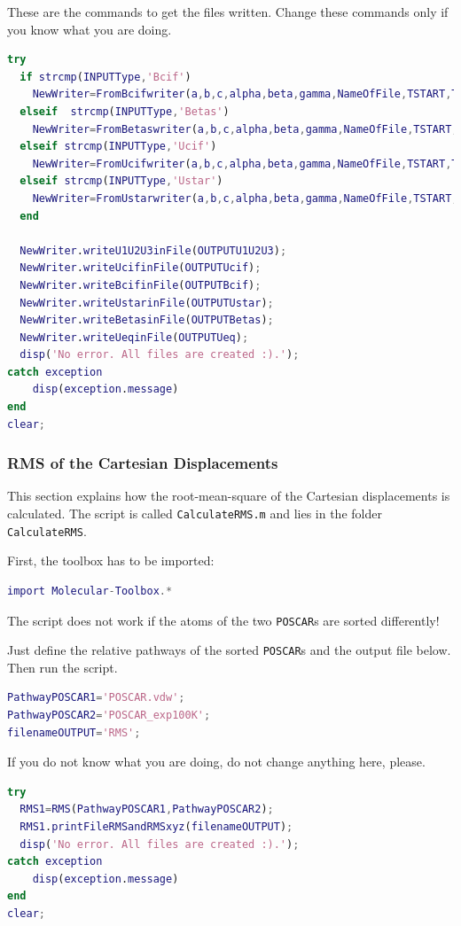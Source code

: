 \documentclass[12pt,a4paper]{article}
\begin{document}
These are the commands to get the files written. Change these commands only if you know what you are doing.
\begin{lstlisting}[frame=single,language=Matlab] 
try
  if strcmp(INPUTType,'Bcif')
    NewWriter=FromBcifwriter(a,b,c,alpha,beta,gamma,NameOfFile,TSTART,TEND,TSTEP,NumberofAtomsPerTemperature);
  elseif  strcmp(INPUTType,'Betas')
    NewWriter=FromBetaswriter(a,b,c,alpha,beta,gamma,NameOfFile,TSTART,TEND,TSTEP,NumberofAtomsPerTemperature);
  elseif strcmp(INPUTType,'Ucif')
    NewWriter=FromUcifwriter(a,b,c,alpha,beta,gamma,NameOfFile,TSTART,TEND,TSTEP,NumberofAtomsPerTemperature);
  elseif strcmp(INPUTType,'Ustar')
    NewWriter=FromUstarwriter(a,b,c,alpha,beta,gamma,NameOfFile,TSTART,TEND,TSTEP,NumberofAtomsPerTemperature);
  end

  NewWriter.writeU1U2U3inFile(OUTPUTU1U2U3);
  NewWriter.writeUcifinFile(OUTPUTUcif);
  NewWriter.writeBcifinFile(OUTPUTBcif);
  NewWriter.writeUstarinFile(OUTPUTUstar);
  NewWriter.writeBetasinFile(OUTPUTBetas);
  NewWriter.writeUeqinFile(OUTPUTUeq);
  disp('No error. All files are created :).');
catch exception
    disp(exception.message)
end
clear;
\end{lstlisting}



    


\subsubsection{RMS of the Cartesian Displacements}
This section explains how the root-mean-square of the Cartesian displacements is calculated. The script is called \texttt{CalculateRMS.m} and lies in the folder \texttt{CalculateRMS}.

First, the toolbox has to be imported:

\begin{lstlisting}[frame=single,language=Matlab] 
import Molecular-Toolbox.*
\end{lstlisting}
The script does not work if the atoms of the two \texttt{POSCAR}s are sorted differently!

Just define the relative pathways of the sorted \texttt{POSCAR}s and the output file below. Then run the script.
\begin{lstlisting}[frame=single,language=Matlab] 
PathwayPOSCAR1='POSCAR.vdw';
PathwayPOSCAR2='POSCAR_exp100K';
filenameOUTPUT='RMS';
\end{lstlisting}
If you do not know what you are doing, do not change anything here, please.
\begin{lstlisting}[frame=single,language=Matlab] 
try
  RMS1=RMS(PathwayPOSCAR1,PathwayPOSCAR2);
  RMS1.printFileRMSandRMSxyz(filenameOUTPUT);
  disp('No error. All files are created :).');
catch exception
    disp(exception.message)
end
clear;
\end{lstlisting}
\end{document}
